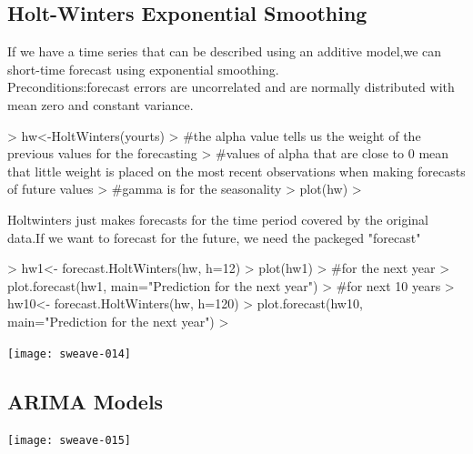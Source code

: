 \documentclass[11pt, a4paper]{article} %
\begin{document}
\subsection{Holt-Winters Exponential Smoothing}%

If we have a time series that can be described using an additive model,we can short-time forecast using exponential smoothing.\\
Preconditions:forecast errors are uncorrelated and are normally distributed with mean zero and constant variance.
\begin{Schunk}
\begin{Sinput}
> hw<-HoltWinters(yourts)
> #the alpha value tells us the weight of the previous values for the forecasting
> #values of alpha that are close to 0 mean that little weight is placed on the most recent observations when making forecasts of future values
> #gamma is for the seasonality
> plot(hw)
> 
\end{Sinput}
\end{Schunk}
Holtwinters just makes forecasts for the time period covered by the original data.If we want to forecast for the future, we need the packeged "forecast"

\begin{Schunk}
\begin{Sinput}
> hw1<- forecast.HoltWinters(hw, h=12)
> plot(hw1)
> #for the next year  
> plot.forecast(hw1, main="Prediction for the next year")
> #for next 10 years
> hw10<- forecast.HoltWinters(hw, h=120)
> plot.forecast(hw10, main="Prediction for the next year")
> 
\end{Sinput}
\end{Schunk}
\texttt{[image: sweave-014]}

\subsection{ARIMA Models}%
\begin{Schunk}
\end{Schunk}
\texttt{[image: sweave-015]}
\end{document}
